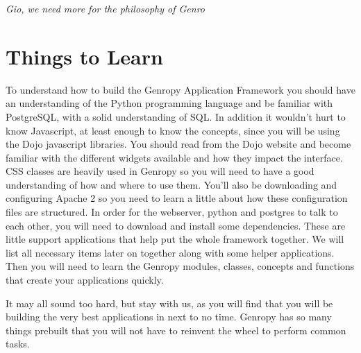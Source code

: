  \emph{Gio, we need more for the philosophy of Genro}



\section{Things to Learn} %
\label{sec:Things_to _earn}
To understand how to build the Genropy Application Framework you should have an understanding of the Python programming language and be familiar with PostgreSQL, with a solid understanding of SQL. In addition it wouldn't hurt to know Javascript, at least enough to know the concepts, since you will be using the Dojo javascript libraries. You should read from the Dojo website and become familiar with the different widgets available and how they impact the interface. CSS classes are heavily used in Genropy so you will need to have a good understanding of how and where to use them. You'll also be downloading and configuring Apache 2 so you need to learn a little about how these configuration files are structured. In order for the webserver, python and postgres to talk to each other, you will need to download and install some dependencies. These are little support applications that help put the whole framework together. We will list all necessary items later on together along with some helper applications. Then you will need to learn the Genropy modules, classes, concepts and functions that create your applications quickly.

It may all sound too hard, but stay with us, as you will find that you will be building the very best applications in next to no time.  Genropy has so many things prebuilt that you will not have to reinvent the wheel to perform common tasks.

